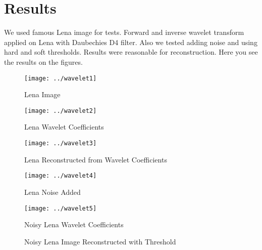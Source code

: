 \documentclass{article}
\begin{document}
\section{Results}

We used famous Lena image for tests. Forward and inverse wavelet transform applied on Lena with Daubechies D4 filter. Also we tested adding noise and using hard and soft thresholds. Results were reasonable for reconstruction. Here you see the results on the figures. 

\begin{figure}[h!]
	\centering
    \texttt{[image: ../wavelet1]}
    \caption{Lena Image}
\end{figure}

\begin{figure}[h!]
	\centering
    \texttt{[image: ../wavelet2]}
    \caption{Lena Wavelet Coefficients}
\end{figure}

\begin{figure}[h!]
	\centering
    \texttt{[image: ../wavelet3]}
    \caption{Lena Reconstructed from Wavelet Coefficients}
\end{figure}

\begin{figure}[h!]
	\centering
    \texttt{[image: ../wavelet4]}
    \caption{Lena Noise Added}
\end{figure}

\begin{figure}[h!]
	\centering
    \texttt{[image: ../wavelet5]}
    \caption{Noisy Lena Wavelet Coefficients}
\end{figure}

\begin{figure}[h!]
\centering
{}
\caption{Noisy Lena Image Reconstructed with Threshold}
\end{figure}




%
%    
\end{document}
